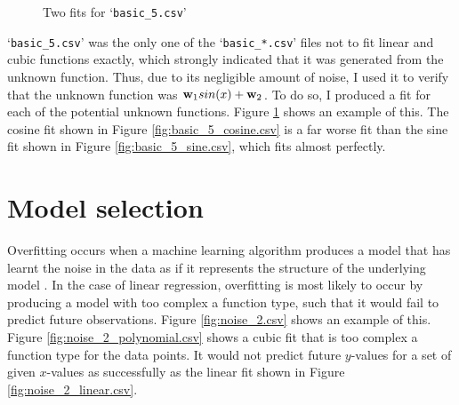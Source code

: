 \documentclass[onecolumn, 12pt, a4paper]{article}
\begin{document}
\begin{figure}[htbp]
    \centering
    \hfill
    \caption{Two fits for `\texttt{basic\_5.csv}'}
    \label{fig:basic_5.csv}
\end{figure}

`\texttt{basic\_5.csv}' was the only one of the
`\texttt{basic\_*.csv}' files not to fit linear and
cubic functions exactly, which strongly indicated that it was generated from
the unknown function. 
Thus, due to its negligible amount of noise,
I used it to verify that the unknown function was
$\vb{w}_{1}sin(x) + \vb{w}_{2}$.
To do so, I produced a fit for each of the potential
unknown functions.
Figure \ref{fig:basic_5.csv} shows an example of this.
The cosine fit shown in Figure \ref{fig:basic_5_cosine.csv}
is a far worse fit than the sine fit shown in Figure
\ref{fig:basic_5_sine.csv}, which fits almost perfectly.

\section{Model selection}

Overfitting occurs when a machine learning algorithm
produces a model that has learnt the noise in the data
as if it represents the structure of the underlying
model \cite{MSMI}.
In the case of linear regression, overfitting is most
likely to occur by producing a model with too complex a function
type, such that it would fail to predict future observations.
Figure \ref{fig:noise_2.csv} shows an example of this. 
Figure \ref{fig:noise_2_polynomial.csv} shows a cubic fit that is too complex a 
function type for the data points.
It would not predict future $y$-values for a set of 
given $x$-values as successfully as the linear fit shown in Figure \ref{fig:noise_2_linear.csv}.
\end{document}
